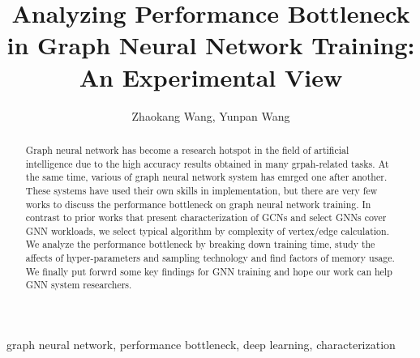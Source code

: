 \documentclass{elsarticle}
\begin{document}
\begin{frontmatter}

\title{Analyzing Performance Bottleneck in Graph Neural Network Training: An Experimental View}
\author{Zhaokang Wang, Yunpan Wang}
\address{State Key Laboratory for Novel Software Technology, Department of Computer Science and Technology, Nanjing University, Nanjing 210023, China}

\begin{abstract}
    Graph neural network has become a research hotspot in the field of artificial intelligence due to the high accuracy results 
    obtained in many grpah-related tasks. At the same time, various of graph neural network system has emrged one after another.
    These systems have used their own skills in implementation, but there are very few works to discuss the performance bottleneck
    on graph neural network training. In contrast to prior works that present characterization of GCNs and select GNNs cover GNN workloads,
    we select typical algorithm by complexity of vertex/edge calculation. We analyze the performance bottleneck by breaking down training
    time, study the affects of hyper-parameters and sampling technology and find factors of memory usage. We finally put forwrd some key
    findings for GNN training and hope our work can help GNN system researchers. 
\end{abstract}

\begin{keyword}
    graph neural network, performance bottleneck, deep learning, characterization
\end{keyword}

\end{frontmatter}

\linenumbers











\end{document}
